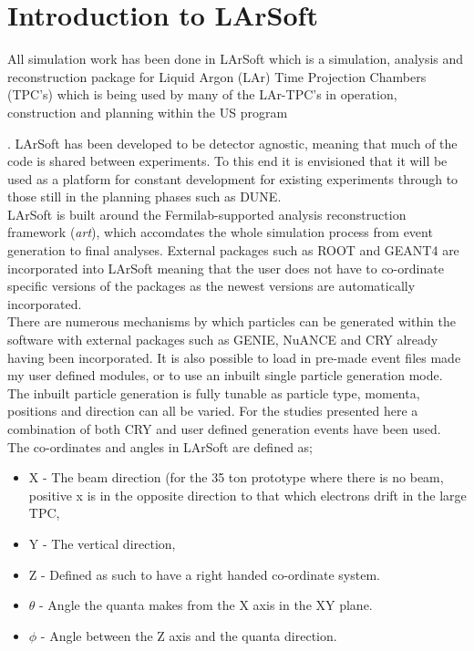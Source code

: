 \documentclass[11pt]{report} %
\begin{document}
\section{Introduction to LArSoft}
All simulation work has been done in LArSoft which is a simulation, analysis and reconstruction package for Liquid Argon (LAr) Time Projection Chambers (TPC's) which is being used by many of the LAr-TPC's in operation, construction and planning within the US program {\cite{Church_LArSoft}. LArSoft has been developed to be detector agnostic, meaning that much of the code is shared between experiments. To this end it is envisioned that it will be used as a platform for constant development for existing experiments through to those still in the planning phases such as DUNE. \\ 

LArSoft is built around the Fermilab-supported analysis reconstruction framework (\emph{art}), which accomdates the whole simulation process from event generation to final analyses. External packages such as ROOT and GEANT4 are incorporated into LArSoft meaning that the user does not have to co-ordinate specific versions of the packages as the newest versions are automatically incorporated. \\

There are numerous mechanisms by which particles can be generated within the software with external packages such as GENIE, NuANCE and CRY already having been incorporated. It is also possible to load in pre-made event files made my user defined modules, or to use an inbuilt single particle generation mode. The inbuilt particle generation is fully tunable as particle type, momenta, positions and direction can all be varied. For the studies presented here a combination of both CRY and user defined generation events have been used.\\

The co-ordinates and angles in LArSoft are defined as; 
\begin{itemize}
\item X - The beam direction (for the 35 ton prototype where there is no beam, positive x is in the opposite direction to that which electrons drift in the large TPC, 
\item Y - The vertical direction, 
\item Z - Defined as such to have a right handed co-ordinate system.
\item $\theta$ - Angle the quanta makes from the X axis in the XY plane.
\item $\phi$ - Angle between the Z axis and the quanta direction.
\end{itemize}

}
\end{document}
